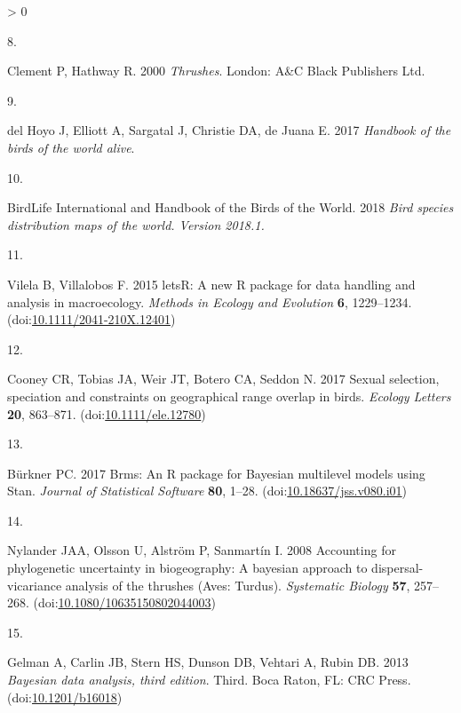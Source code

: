 \documentclass[
  a4paper,
]{article}
\newlength{\cslhangindent}
\newlength{\csllabelwidth}
\newenvironment{CSLReferences}[2] %
 {%
  \setlength{\parindent}{0pt}
  \ifodd #1 \everypar{\setlength{\hangindent}{\cslhangindent}}\ignorespaces\fi
  \ifnum #2 > 0
  \setlength{\parskip}{#2\baselineskip}
  \fi
 }%
 {}
\newcommand{\CSLLeftMargin}[1]{\parbox[t]{\csllabelwidth}{#1}}
\newcommand{\CSLRightInline}[1]{\parbox[t]{\linewidth - \csllabelwidth}{#1}\break}
\begin{document}
\begin{CSLReferences}{0}{0}
\leavevmode\hypertarget{ref-clement2000}{}%
\CSLLeftMargin{8. }
\CSLRightInline{Clement P, Hathway R. 2000 \emph{Thrushes}. {London}:
{A\&C Black Publishers Ltd}. }

\leavevmode\hypertarget{ref-delhoyo2017}{}%
\CSLLeftMargin{9. }
\CSLRightInline{del Hoyo J, Elliott A, Sargatal J, Christie DA, de Juana
E. 2017 \emph{Handbook of the birds of the world alive}. }

\leavevmode\hypertarget{ref-birdlifeinternationalandhandbookofthebirdsoftheworld2018}{}%
\CSLLeftMargin{10. }
\CSLRightInline{BirdLife International and Handbook of the Birds of the
World. 2018 \emph{Bird species distribution maps of the world. {Version}
2018.1.} }

\leavevmode\hypertarget{ref-vilela2015}{}%
\CSLLeftMargin{11. }
\CSLRightInline{Vilela B, Villalobos F. 2015 {letsR}: A new {R} package
for data handling and analysis in macroecology. \emph{Methods in Ecology
and Evolution} \textbf{6}, 1229--1234.
(doi:\href{https://doi.org/10.1111/2041-210X.12401}{10.1111/2041-210X.12401})}

\leavevmode\hypertarget{ref-cooney2017}{}%
\CSLLeftMargin{12. }
\CSLRightInline{Cooney CR, Tobias JA, Weir JT, Botero CA, Seddon N. 2017
Sexual selection, speciation and constraints on geographical range
overlap in birds. \emph{Ecology Letters} \textbf{20}, 863--871.
(doi:\href{https://doi.org/10.1111/ele.12780}{10.1111/ele.12780})}

\leavevmode\hypertarget{ref-burkner2017}{}%
\CSLLeftMargin{13. }
\CSLRightInline{Bürkner PC. 2017 Brms: {An R} package for {Bayesian}
multilevel models using {Stan}. \emph{Journal of Statistical Software}
\textbf{80}, 1--28.
(doi:\href{https://doi.org/10.18637/jss.v080.i01}{10.18637/jss.v080.i01})}

\leavevmode\hypertarget{ref-nylander2008}{}%
\CSLLeftMargin{14. }
\CSLRightInline{Nylander JAA, Olsson U, Alström P, Sanmartín I. 2008
Accounting for phylogenetic uncertainty in biogeography: {A} bayesian
approach to dispersal-vicariance analysis of the thrushes ({Aves}:
{Turdus}). \emph{Systematic Biology} \textbf{57}, 257--268.
(doi:\href{https://doi.org/10.1080/10635150802044003}{10.1080/10635150802044003})}

\leavevmode\hypertarget{ref-gelman2013}{}%
\CSLLeftMargin{15. }
\CSLRightInline{Gelman A, Carlin JB, Stern HS, Dunson DB, Vehtari A,
Rubin DB. 2013 \emph{Bayesian data analysis, third edition}. Third.
{Boca Raton, FL}: {CRC Press}.
(doi:\href{https://doi.org/10.1201/b16018}{10.1201/b16018})}


\end{CSLReferences}
\end{document}
